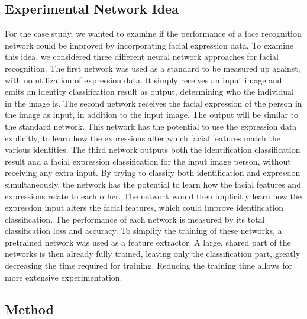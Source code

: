 \subsection{Experimental Network Idea}

For the case study, we wanted to examine if the performance of a face recognition network could be improved by incorporating facial expression data. To examine this idea, we considered three different neural network approaches for facial recognition. The first network was used as a standard to be measured up against, with no utilization of expression data. It simply receives an input image and emits an identity classification result as output, determining who the individual in the image is. The second network receives the facial expression of the person in the image as input, in addition to the input image. The output will be similar to the standard network. This network has the potential to use the expression data explicitly, to learn how the expressions alter which facial features match the various identities. The third network outputs both the identification classification result and a facial expression classification for the input image person, without receiving any extra input. By trying to classify both identification and expression simultaneously, the network has the potential to learn how the facial features and expressions relate to each other. The network would then implicitly learn how the expression input alters the facial features, which could improve identification classification. The performance of each network is measured by its total classification loss and accuracy. To simplify the training of these networks, a pretrained network was used as a feature extractor. A large, shared part of the networks is then already fully trained, leaving only the classification part, greatly decreasing the time required for training. Reducing the training time allows for more extensive experimentation. 

\subsection{Method}



